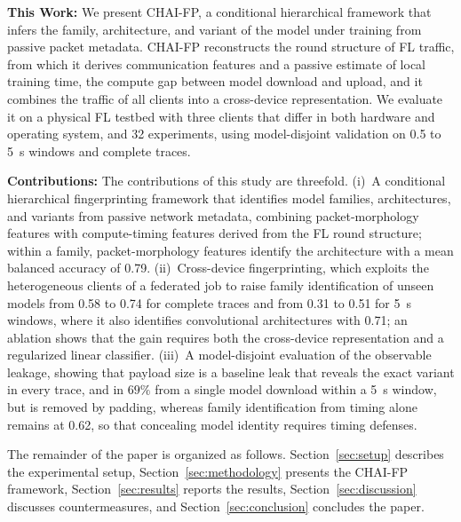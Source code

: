 \textbf{This Work:} We present CHAI-FP, a conditional hierarchical framework
that infers the family, architecture, and variant of the model under training
from passive packet metadata. CHAI-FP reconstructs the round structure of FL
traffic, from which it derives communication features and a passive estimate of
local training time, the compute gap between model download and upload, and it
combines the traffic of all clients into a cross-device representation. We
evaluate it on a physical FL testbed with three clients that differ in both
hardware and operating system, and 32
experiments, using model-disjoint validation on 0.5 to 5~s windows and complete
traces.

\noindent\textbf{Contributions:} The contributions of this study are threefold.
(i)~A conditional hierarchical fingerprinting framework that identifies model
families, architectures, and variants from passive network metadata, combining
packet-morphology features with compute-timing features derived from the FL
round structure; within a family, packet-morphology features identify the
architecture with a mean balanced accuracy of 0.79.
(ii)~Cross-device fingerprinting, which exploits the heterogeneous clients of a
federated job to raise family identification of unseen models from 0.58 to 0.74
for complete traces and from 0.31 to 0.51 for 5~s windows, where it also
identifies convolutional architectures with 0.71; an ablation shows that the gain requires both
the cross-device representation and a regularized linear classifier.
(iii)~A model-disjoint evaluation of the observable leakage, showing that
payload size is a baseline leak that reveals the exact variant in every trace,
and in $69\%$ from a single model download within a 5~s window, but is
removed by padding, whereas family identification from timing
alone remains at 0.62, so that concealing model identity requires timing
defenses.

The remainder of the paper is organized as follows.
Section~\ref{sec:setup} describes the experimental setup,
Section~\ref{sec:methodology} presents the CHAI-FP framework,
Section~\ref{sec:results} reports the results,
Section~\ref{sec:discussion} discusses countermeasures, and
Section~\ref{sec:conclusion} concludes the paper.
